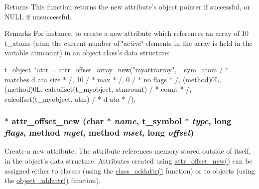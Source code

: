 \begin{DoxyReturn}{Returns}
This function returns the new attribute's object pointer if successful, or NULL if unsuccessful.
\end{DoxyReturn}
\begin{DoxyRemark}{Remarks}
For instance, to create a new attribute which references an array of 10 t\_\-atoms ({\ttfamily atm}; the current number of \char`\"{}active\char`\"{} elements in the array is held in the variable {\ttfamily atmcount}) in an object class's data structure: 
\begin{DoxyCode}
    t_object *attr = attr_offset_array_new("myattrarray", _sym_atom / * matches d
      ata size * /, 10 / * max * /, 0 / * no flags * /, (method)0L, (method)0L, 
      calcoffset(t_myobject, atmcount) / * count * /, calcoffset(t_myobject, atm) / * d
      ata * /);
\end{DoxyCode}
 
\end{DoxyRemark}
\hypertarget{group__attr_ga089ad1af7af1d0771b4a4e1417d16779}{
\subsubsection[{attr\_\-offset\_\-new}]{$\ast$ attr\_\-offset\_\-new (char $\ast$ {\em name}, \/  {\bf t\_\-symbol} $\ast$ {\em type}, \/  long {\em flags}, \/  {\bf method} {\em mget}, \/  {\bf method} {\em mset}, \/  long {\em offset})}}
\label{group__attr_ga089ad1af7af1d0771b4a4e1417d16779}


Create a new attribute. The attribute references memory stored outside of itself, in the object's data structure. Attributes created using \hyperlink{group__attr_ga089ad1af7af1d0771b4a4e1417d16779}{attr\_\-offset\_\-new()} can be assigned either to classes (using the \hyperlink{group__class_ga2289eb7e26b552be6e015c2f9912a9ac}{class\_\-addattr()} function) or to objects (using the \hyperlink{group__attr_ga69d88788c952e914ecccd88179d0dfda}{object\_\-addattr()} function).


